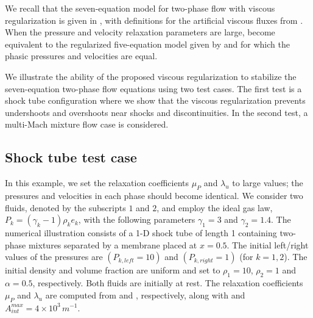 \documentclass[preprint,10pt]{elsarticle}
\begin{document}
We recall that the seven-equation model for two-phase flow with viscous regularization is given 
in , with definitions for the artificial viscous fluxes 
from . 
%
When the pressure and velocity relaxation parameters are large,  
become equivalent to the regularized five-equation model given by  and for which 
the phasic pressures and velocities are equal.


%
We illustrate the ability of the proposed viscous regularization to stabilize the 
seven-equation two-phase flow equations using two test cases.
The first test is a shock tube configuration where we show that the viscous regularization prevents undershoots 
and overshoots near shocks and discontinuities. 
In the second test, a multi-Mach mixture flow case is considered.

\subsection{Shock tube test case}\label{sec:first-test}

In this example, we set the relaxation coefficients $\mu_P$ and $\lambda_u$ to large values; the pressures and velocities in each phase should become identical. 
We consider two fluids, denoted by the subscripts $1$ and $2$, and employ the ideal gas law, $P_k=(\gamma_k-1) \rho_k e_k$, with the following parameters $\gamma_1=3$ and $\gamma_2=1.4$. 
The numerical illustration consists of a 1-D shock tube of length 1 containing two-phase mixtures separated by a membrane placed at $x=0.5$. The initial left/right values of the pressures are
 $(P_{k,left}=10)$ and $(P_{k,right}=1)$ (for $k=1,2$). The initial density and volume fraction are uniform and set to $\rho_1=10$, $\rho_2=1$ and $\alpha = 0.5$, respectively. 
Both fluids are initially at rest. The relaxation coefficients $\mu_P$ and $\lambda_u$ are computed from  and , respectively, 
along with  and $A_{int}^{max}=4 \times 10^3\,m^{-1}$.
 
\end{document}
